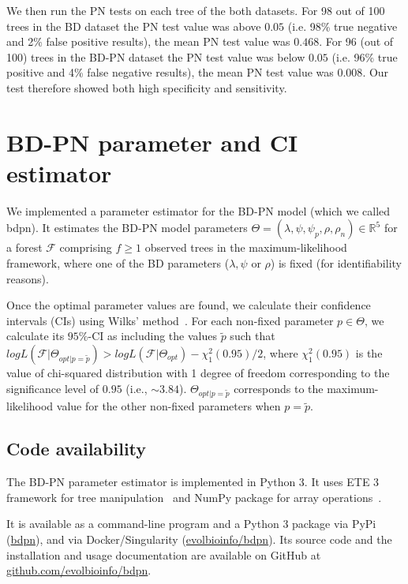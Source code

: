 \documentclass[a4paper,10pt]{article}
\begin{document}
We then run the PN tests on each tree of the both datasets. For 98 out of 100 trees in the BD dataset the PN test value was above $0.05$ (i.e. 98\% true negative and 2\% false positive results), the mean PN test value was $0.468$. For 96 (out of 100) trees in the BD-PN dataset the PN test value was below $0.05$ (i.e. 96\% true positive and 4\% false negative results), the mean PN test value was $0.008$.
Our test therefore showed both high specificity and sensitivity.
 

\section{BD-PN parameter and CI estimator}
We implemented a parameter estimator for the BD-PN model (which we called bdpn). It estimates the BD-PN model parameters  $\Theta = (\lambda,\psi,\psi_p,\rho,\rho_n) \in \mathbb{R}^5$ for a forest $\mathscr{F}$ comprising $f \geq 1$ observed trees in the maximum-likelihood framework, where one of the BD parameters ($\lambda,\psi$ or $\rho$) is fixed (for identifiability reasons). 

Once the optimal parameter values are found, we calculate their confidence intervals (CIs) using Wilks' method~\citep{Wilks1938}.
For each non-fixed parameter $p \in \Theta$, we calculate its $95\%$-CI as including the values $\tilde{p}$ such that $log L(\mathscr{F}|\Theta_{opt|p=\tilde{p}}) > log L(\mathscr{F}| \Theta_{opt}) - \chi^2_1(0.95) / 2$, where $\chi^2_1(0.95)$ is the value of chi-squared distribution with 1 degree of freedom corresponding to the significance level of $0.95$ (i.e., $\sim3.84$). $\Theta_{opt|p=\tilde{p}}$ corresponds to the maximum-likelihood value for the other non-fixed parameters when $p = \tilde{p}$. 

\subsection*{Code availability}
The BD-PN parameter estimator is implemented in Python 3. It uses ETE 3 framework for tree manipulation~\citep{Huerta-Cepas2016} and NumPy package for array operations~\citep{harris_array_2020}. 

It is available as a command-line program and a Python 3 package via PyPi (\href{https://pypi.org/project/bdpn}{bdpn}), and via Docker/Singularity (\href{https://hub.docker.com/r/evolbioinfo/bdpn/tags}{evolbioinfo/bdpn}). Its source code and the installation and usage documentation are available on GitHub at \href{https://github.com/evolbioinfo/bdpn}{github.com/evolbioinfo/bdpn}.
\end{document}
